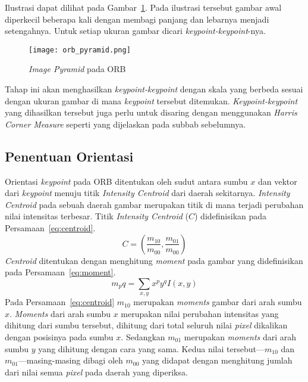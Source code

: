Ilustrasi dapat dilihat pada Gambar~\ref{fig:orb_pyramid}. Pada ilustrasi tersebut gambar awal diperkecil beberapa kali dengan membagi panjang dan lebarnya menjadi setengahnya. Untuk setiap ukuran gambar dicari \textit{keypoint-keypoint}-nya.

\begin{figure}[H]
	\centering
	\texttt{[image: orb\_pyramid.png]}
	\caption{\textit{Image Pyramid} pada ORB}
	\label{fig:orb_pyramid}	
\end{figure}

Tahap ini akan menghasilkan \textit{keypoint-keypoint} dengan skala yang berbeda sesuai dengan ukuran gambar di mana \textit{keypoint} tersebut ditemukan. \textit{Keypoint-keypoint} yang dihasilkan tersebut juga perlu untuk disaring dengan menggunakan \textit{Harris Corner Measure} seperti yang dijelaskan pada subbab sebelumnya. 

\subsection{Penentuan Orientasi}
\label{subsec:orb_orientasi}
Orientasi \textit{keypoint} pada ORB ditentukan oleh sudut antara sumbu $x$ dan vektor dari \textit{keypoint} menuju titik \textit{Intensity Centroid} dari daerah sekitarnya. \textit{Intensity Centroid} pada sebuah daerah gambar merupakan titik di mana terjadi perubahan nilai intensitas terbesar. Titik \textit{Intensity Centroid} ($C$) didefinisikan pada Persamaan~\ref{eq:centroid}.
\begin{equation}
	C=(\frac{m_{10}}{m_{00}}, \frac{m_{01}}{m_{00}})
	\label{eq:centroid}
\end{equation}
\textit{Centroid} ditentukan dengan menghitung \textit{moment} pada gambar yang didefinisikan pada Persamaan~\ref{eq:moment}.
\begin{equation}
	m_pq=\sum_{x,y}x^py^qI(x,y)
	\label{eq:moment}
\end{equation}
Pada Persamaan~\ref{eq:centroid} $m_{10}$ merupakan \textit{moments} gambar dari arah sumbu $x$. \textit{Moments} dari arah sumbu $x$ merupakan nilai perubahan intensitas yang dihitung dari sumbu tersebut, dihitung dari total seluruh nilai \textit{pixel} dikalikan dengan posisinya pada sumbu $x$. Sedangkan $m_{01}$ merupakan \textit{moments} dari arah sumbu $y$ yang dihitung dengan cara yang sama. Kedua nilai tersebut---$m_{10}$ dan $m_{01}$---masing-masing dibagi oleh $m_{00}$ yang didapat dengan menghitung jumlah dari nilai semua \textit{pixel} pada daerah yang diperiksa.

